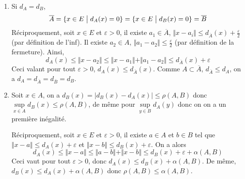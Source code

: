 \begin{solution}
	\phantom{}
	\begin{enumerate}
		\item Si $d_{A}=d_{B}$, 
		$$\overline{A}=\{x\in E\bigm| d_{A}(x)=0\}=\{x\in E\bigm| d_{B}(x)=0\}=\overline{B}$$
		Réciproquement, soit $x\in E$ et $\varepsilon>0$, il existe $a_{1}\in\overline{A}$, $\Vert x-a_{i}\Vert\leqslant d_{\overline{A}}(x)+\frac{\varepsilon}{2}$ (par définition de l'inf). Il existe $a_{2}\in A$, $\Vert a_{1}-a_{2}\Vert\leqslant\frac{\varepsilon}{2}$ (par définition de la fermeture). Ainsi,
		$$d_{A}(x)\leqslant\Vert x-a_{2}\Vert\leqslant\Vert x-a_{1}\Vert+\Vert a_{1}-a_{2}\Vert\leqslant d_{\overline{A}}(x)+\varepsilon$$
		Ceci valant pour tout $\varepsilon>0$, $d_{A}(x)\leqslant d_{\overline{A}}(x)$. Comme $A\subset\overline{A}$, $d_{\overline{A}}\leqslant d_{A}$, on a $d_{A}=d_{\overline{A}}=d_{\overline{B}}=d_{B}$.

		\item Soit $x\in A$, on a $d_{B}(x)=\vert d_{B}(x)-d_{A}(x)\vert\leqslant\rho(A,B)$ donc $\sup\limits_{x\in A}d_{B}(x)\leqslant\rho(A,B)$, de même pour $\sup\limits_{y\in B}d_{A}(y)$ donc on on a un première inégalité.
		
		Réciproquement, soit $x\in E$ et $\varepsilon>0$, il existe $a\in A$ et $b\in B$ tel que $\Vert x-a\Vert\leqslant d_{A}(x)+\varepsilon$ et $\Vert x-b\Vert\leqslant d_{B}(x)+\varepsilon$.
		On a alors
		$$d_{A}(x)\leqslant\Vert x-a\Vert\leqslant\Vert a-b\Vert+\Vert x-b\Vert\leqslant d_{B}(x)+\varepsilon+\alpha(A,B)$$
		Ceci vaut pour tout $\varepsilon>0$, donc $d_{A}(x)\leqslant d_{B}(x)+\alpha(A,B)$. De même, $d_{B}(x)\leqslant d_{A}(x)+\alpha(A,B)$ donc $\rho(A,B)\leqslant\alpha(A,B)$.
	\end{enumerate}
\end{solution}

